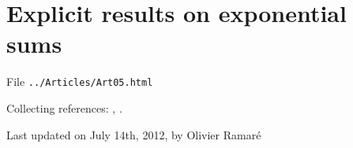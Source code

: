 \chapter{   Explicit results on exponential sums}

File \texttt{../Articles/Art05.html}










Collecting references:
\cite{Granville-Ramare*96},
\cite{Daboussi-Rivat*01}.



 
 







  
  Last updated on July 14th, 2012, by Olivier Ramar\'e

















